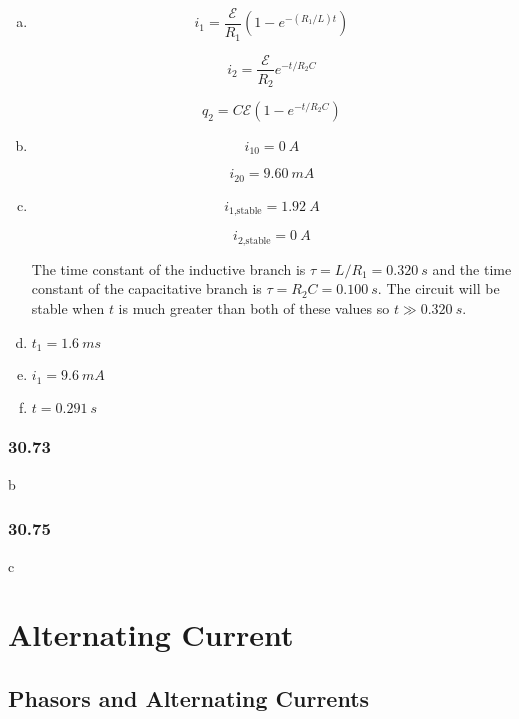 \documentclass{article}
\begin{document}
\begin{enumerate}[(a)]
  \item

        \[i_1 = \frac{\mathcal{E}}{R_1} (1 - e^{-(R_1 / L) t})\]

        \[i_2 = \frac{\mathcal{E}}{R_2} e^{-t / R_2 C}\]

        \[q_2 = C \mathcal{E} (1 - e^{-t / R_2 C})\]

  \item

        \[i_{10} = \qty{0}{A}\]

        \[i_{20} = \qty{9.60}{mA}\]

  \item

        \[i_{1\text{,stable}} = \qty{1.92}{A}\]

        \[i_{2\text{,stable}} = \qty{0}{A}\]

        The time constant of the inductive branch is $\tau = L / R_1 = \qty{0.320}{s}$ and the time constant of the capacitative branch is $\tau = R_2 C = \qty{0.100}{s}$. The circuit will be stable when $t$ is much greater than both of these values so $t \gg \qty{0.320}{s}$.

  \item $t_1 = \qty{1.6}{ms}$

  \item $i_1 = \qty{9.6}{mA}$

  \item $t = \qty{0.291}{s}$
\end{enumerate}

\subsubsection{30.73}

b

\subsubsection{30.75}

c

\section{Alternating Current}

\subsection{Phasors and Alternating Currents}
\end{document}
